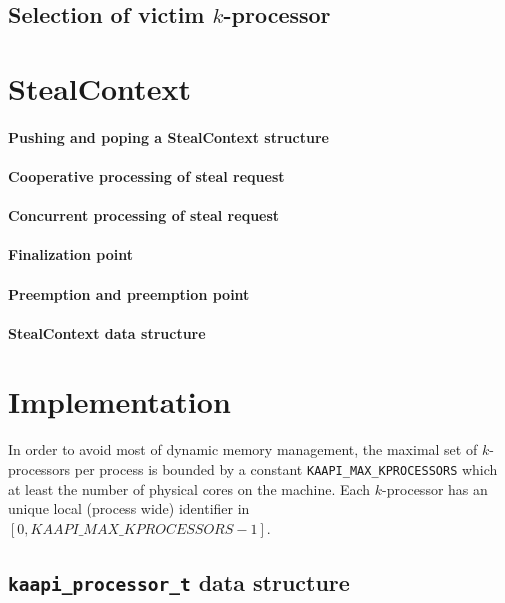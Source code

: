\documentclass[12pt]{report}
\begin{document}
\subsection{Selection of victim $k$-processor}




\section{StealContext}

\paragraph{Pushing and poping a StealContext structure}

\paragraph{Cooperative processing of steal request}

\paragraph{Concurrent processing of steal request}

\paragraph{Finalization point}

\paragraph{Preemption and preemption point}

\paragraph{StealContext data structure}

\section{Implementation}

In order to avoid most of dynamic memory management, the maximal set of $k$-processors per process is bounded by a constant \verb+KAAPI_MAX_KPROCESSORS+ which at least the number of physical cores on the machine.
Each $k$-processor has an unique local (process wide) identifier in $[0, KAAPI\_MAX\_KPROCESSORS-1]$.

\subsection{\texttt{kaapi\_processor\_t} data structure}
\end{document}
